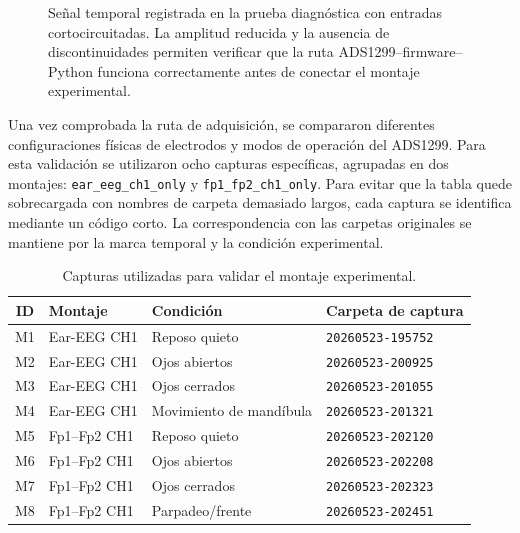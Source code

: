 \begin{figure}[!htbp]
    \centering
    \caption{Señal temporal registrada en la prueba diagnóstica con entradas cortocircuitadas. La amplitud reducida y la ausencia de discontinuidades permiten verificar que la ruta ADS1299--firmware--Python funciona correctamente antes de conectar el montaje experimental.}
    \label{fig:validacion_shorted_inputs}
\end{figure}

Una vez comprobada la ruta de adquisición, se compararon diferentes configuraciones físicas de electrodos y modos de operación del ADS1299. Para esta validación se utilizaron ocho capturas específicas, agrupadas en dos montajes: \texttt{ear\_eeg\_ch1\_only} y \texttt{fp1\_fp2\_ch1\_only}. Para evitar que la tabla quede sobrecargada con nombres de carpeta demasiado largos, cada captura se identifica mediante un código corto. La correspondencia con las carpetas originales se mantiene por la marca temporal y la condición experimental.

\begin{table}[!htbp]
    \centering
    \small
    \caption{Capturas utilizadas para validar el montaje experimental.}
    \label{tab:validacion_capturas_montaje}
    \begin{tabular}{c p{} p{} p{}}
        \hline
        \textbf{ID} & \textbf{Montaje} & \textbf{Condición} & \textbf{Carpeta de captura} \\
        \hline
        M1 & Ear-EEG CH1 & Reposo quieto & \texttt{20260523-195752} \\
        M2 & Ear-EEG CH1 & Ojos abiertos & \texttt{20260523-200925} \\
        M3 & Ear-EEG CH1 & Ojos cerrados & \texttt{20260523-201055} \\
        M4 & Ear-EEG CH1 & Movimiento de mandíbula & \texttt{20260523-201321} \\
        M5 & Fp1--Fp2 CH1 & Reposo quieto & \texttt{20260523-202120} \\
        M6 & Fp1--Fp2 CH1 & Ojos abiertos & \texttt{20260523-202208} \\
        M7 & Fp1--Fp2 CH1 & Ojos cerrados & \texttt{20260523-202323} \\
        M8 & Fp1--Fp2 CH1 & Parpadeo/frente & \texttt{20260523-202451} \\
        \hline
    \end{tabular}
\end{table}

